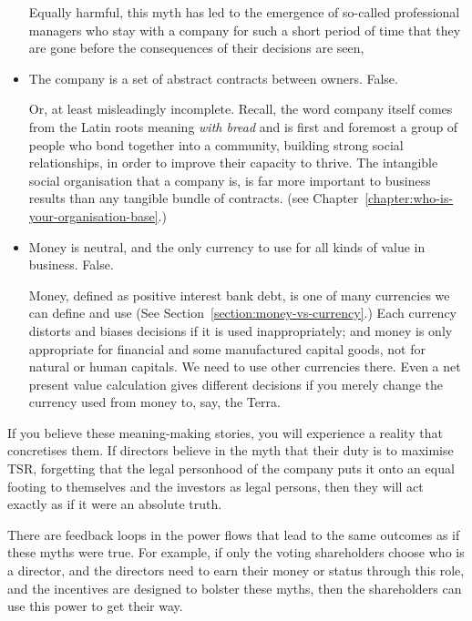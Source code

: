 \begin{itemize}
Equally harmful, this myth has led to the emergence of so-called professional managers who stay with a company for such a short period of time that they are gone before the consequences of their decisions are seen, 


\item The company is a set of abstract contracts between owners. False.


Or, at least misleadingly incomplete. Recall, the word company itself comes from the Latin roots meaning \emph{with bread} and is first and foremost a group of people who bond together into a community, building strong social relationships, in order to improve their capacity to thrive. The intangible social organisation that a company is, is far more important to business results than any tangible bundle of contracts. (see Chapter~\ref{chapter:who-is-your-organisation-base}.)


\item Money is neutral, and the only currency to use for all kinds of value in business. False. 


Money, defined as positive interest bank debt, is one of many currencies we can define and use (See Section~\ref{section:money-vs-currency}.) Each currency distorts and biases decisions if it is used inappropriately; and money is only appropriate for financial and some manufactured capital goods, not for natural or human capitals. We need to use other currencies there. Even a net present value calculation gives different decisions if you merely change the currency used from money to, say, the Terra\cite{lietaer-money-and-sustainability}.


\end{itemize}


If you believe these meaning\hyp{}making stories, you will experience a reality that concretises them. If directors believe in the myth that their duty is to maximise TSR, forgetting that the legal personhood of the company puts it onto an equal footing to themselves and the investors as legal persons, then they will act exactly as if it were an absolute truth.


There are feedback loops in the power flows that lead to the same outcomes as if these myths were true. For example, if only the voting shareholders choose who is a director, and the directors need to earn their money or status through this role, and the incentives are designed to bolster these myths, then the shareholders can use this power to get their way.


